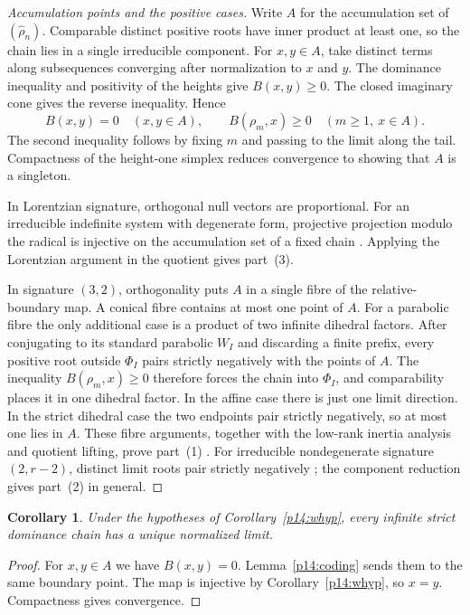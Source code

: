 \documentclass[11pt,reqno]{amsart}
\theoremstyle{plain}
\newtheorem{corollary}[theorem]{Corollary}
\theoremstyle{definition}
\theoremstyle{remark}
\numberwithin{equation}{section}
\begin{document}
\begin{proof}[Accumulation points and the positive cases]
Write $A$ for the accumulation set of $(\widehat{\rho}_n)$. Comparable
distinct positive roots have inner product at least one, so the chain
lies in a single irreducible component. For $x,y\in A$, take distinct
terms along subsequences converging after normalization to $x$ and $y$.
The dominance inequality and positivity of the heights give $B(x,y)\ge0$.
The closed imaginary cone gives the reverse inequality. Hence
\[
 B(x,y)=0\quad(x,y\in A),\qquad
 B(\rho_m,x)\ge0\quad(m\ge1,\ x\in A).
\]
The second inequality follows by fixing $m$ and passing to the limit
along the tail. Compactness of the height-one simplex reduces
convergence to showing that $A$ is a singleton.

In Lorentzian signature, orthogonal null vectors are proportional.
For an irreducible indefinite system with degenerate form, projective
projection modulo the radical is injective on the accumulation set of
a fixed chain \cite[Proposition~2.16]{WangUniqueness}. Applying the
Lorentzian argument in the quotient gives part~(3).

In signature $(3,2)$, orthogonality puts $A$ in a single fibre of the
relative-boundary map. A conical fibre contains at most one point of
$A$. For a parabolic fibre the only additional case is a product of
two infinite dihedral factors. After conjugating to its standard
parabolic $W_I$ and discarding a finite prefix, every positive root
outside $\Phi_I$ pairs strictly negatively with the points of $A$.
The inequality $B(\rho_m,x)\ge0$ therefore forces the chain into
$\Phi_I$, and comparability places it in one dihedral factor. In the
affine case there is just one limit direction. In the strict dihedral
case the two endpoints pair strictly negatively, so at most one lies
in $A$. These fibre arguments, together with the low-rank inertia
analysis and quotient lifting, prove part~(1)
\cite[Theorem~2.1 and Section~3]{WangUniqueness}. For irreducible
nondegenerate signature $(2,r-2)$, distinct limit roots pair strictly
negatively \cite[Section~4.1]{WangUniqueness}; the component reduction
gives part~(2) in general.
\end{proof}

\begin{corollary}\label{cor:word-hyperbolic-dominance-chain}
Under the hypotheses of Corollary~\ref{p14:whyp}, every infinite
strict dominance chain has a unique normalized limit.
\end{corollary}
\begin{proof}
For $x,y\in A$ we have $B(x,y)=0$. Lemma~\ref{p14:coding} sends them to
the same boundary point. The map is injective by
Corollary~\ref{p14:whyp}, so $x=y$. Compactness gives convergence.
\end{proof}
\end{document}
